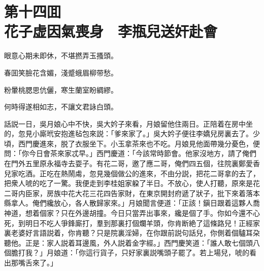 
\chapter*{第十四囬　\\花子虚因氣喪身　李瓶兒送奸赴會}


\begin{myquote}
眼意心期未即休，不堪撚弄玉搔頭。

春囬笑臉花含媚，淺蹙蛾眉柳带愁。

粉暈桃腮思伉儷，寒生蘭室盼綢繆。

何時得遂相如志，不讓文君詠白頭。
\end{myquote}

話説一日，吳月娘心中不快，吳大妗子來看，月娘留他住兩日。正陪着在房中坐的，忽見小廝玳安抱進毡包來説：「爹來家了。」吳大妗子便往李嬌兒房裏去了。少頃，西門慶進來，脱了衣服坐下。小玉拿茶來也不吃。月娘見他面帶幾分憂色，便問：「你今日會茶來家忒早。」西門慶道：「今該常時節會。他家沒地方，請了俺們在門外五里原永福寺去耍子。有花二哥，邀了應二哥，俺們四五個，往院裏鄭愛香兒家吃酒。正吃在熱鬧䖏，忽見幾個做公的進來，不由分説，把花二哥拿的去了，把衆人唬的吃了一驚。我便走到李桂姐家躱了半日。不放心，使人打聽，原來是花二哥内臣家，房族中花大花三花四告家財，在東京開封府遞了狀子，批下來着落本縣拿人。俺們纔放心，各人散歸家來。」月娘聞言便道：「正該！鎭日跟着這夥人喬神道，想着個家？只在外邊胡撞。今日只當弄出事來，纔是個了手。你如今還不心死，到明日不吃人爭鋒廝打，羣到那裏打個爛羊頭，你肯断絶了這條路兒！正經家裏老婆好言語説着，你肯聽？只是院裏淫婦，在你跟前説句話兒，你側着個驢耳朶聽他。正是：家人説着耳邊風，外人説着金字經。」西門慶笑道：「誰人敢七個頭八個膽打我？」月娘道：「你這行貨子，只好家裏説嘴頭子罷了。若上場兒，唬的看出那嘴舌來了。」

